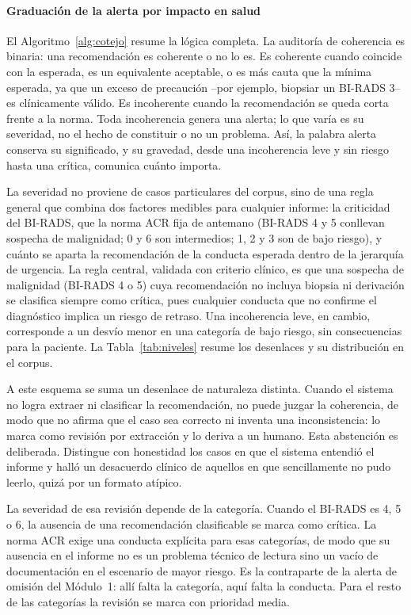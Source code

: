 \documentclass[10pt,journal,a4paper]{IEEEtran}
\begin{document}
\paragraph{Graduaci\'on de la alerta por impacto en salud}
El Algoritmo~\ref{alg:cotejo} resume la l\'ogica completa. La auditor\'ia de coherencia es binaria: una recomendaci\'on es coherente o no lo es. Es coherente cuando coincide con la esperada, es un equivalente aceptable, o es m\'as cauta que la m\'inima esperada, ya que un exceso de precauci\'on --por ejemplo, biopsiar un BI-RADS 3-- es cl\'inicamente v\'alido. Es incoherente cuando la recomendaci\'on se queda corta frente a la norma. Toda incoherencia genera una alerta; lo que var\'ia es su severidad, no el hecho de constituir o no un problema. As\'i, la palabra alerta conserva su significado, y su gravedad, desde una incoherencia leve y sin riesgo hasta una cr\'itica, comunica cu\'anto importa.

La severidad no proviene de casos particulares del corpus, sino de una regla general que combina dos factores medibles para cualquier informe: la criticidad del BI-RADS, que la norma ACR fija de antemano (BI-RADS 4 y 5 conllevan sospecha de malignidad; 0 y 6 son intermedios; 1, 2 y 3 son de bajo riesgo), y cu\'anto se aparta la recomendaci\'on de la conducta esperada dentro de la jerarqu\'ia de urgencia. La regla central, validada con criterio cl\'inico, es que una sospecha de malignidad (BI-RADS 4 o 5) cuya recomendaci\'on no incluya biopsia ni derivaci\'on se clasifica siempre como cr\'itica, pues cualquier conducta que no confirme el diagn\'ostico implica un riesgo de retraso. Una incoherencia leve, en cambio, corresponde a un desv\'io menor en una categor\'ia de bajo riesgo, sin consecuencias para la paciente. La Tabla~\ref{tab:niveles} resume los desenlaces y su distribuci\'on en el corpus.

A este esquema se suma un desenlace de naturaleza distinta. Cuando el sistema no logra extraer ni clasificar la recomendaci\'on, no puede juzgar la coherencia, de modo que no afirma que el caso sea correcto ni inventa una inconsistencia: lo marca como revisi\'on por extracci\'on y lo deriva a un humano. Esta abstenci\'on es deliberada. Distingue con honestidad los casos en que el sistema entendi\'o el informe y hall\'o un desacuerdo cl\'inico de aquellos en que sencillamente no pudo leerlo, quiz\'a por un formato at\'ipico.

La severidad de esa revisi\'on depende de la categor\'ia. Cuando el BI-RADS es 4, 5 o 6, la ausencia de una recomendaci\'on clasificable se marca como cr\'itica. La norma ACR exige una conducta expl\'icita para esas categor\'ias, de modo que su ausencia en el informe no es un problema t\'ecnico de lectura sino un vac\'io de documentaci\'on en el escenario de mayor riesgo. Es la contraparte de la alerta de omisi\'on del M\'odulo~1: all\'i falta la categor\'ia, aqu\'i falta la conducta. Para el resto de las categor\'ias la revisi\'on se marca con prioridad media.
\end{document}
